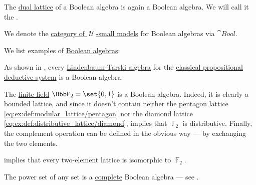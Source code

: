 \begin{definition}
\begin{thmenum}[resume=def:boolean_algebra]
     The \hyperref[def:lattice/opposite]{dual lattice} of a Boolean algebra is again a Boolean algebra. We will call it the .

     We denote the \hyperref[def:category_of_small_first_order_models]{category of \( \mscrU \)-small models} for Boolean algebras via \( \cat{Bool} \).
  \end{thmenum}
\end{definition}

\begin{example}\label{ex:def:boolean_algebra}
  We list examples of \hyperref[def:boolean_algebra]{Boolean algebras}:

  \begin{thmenum}
     As shown in , every \hyperref[def:lindenbaum_tarski_algebra]{Lindenbaum-Tarski algebra} for the \hyperref[def:classical_propositional_deduction_systems]{classical propositional deductive system} is a Boolean algebra.

     The \hyperref[def:finite_field]{finite field} \( \BbbF_2 = \set{ 0, 1 } \) is a Boolean algebra. Indeed, it is clearly a bounded lattice, and since it doesn't contain neither the pentagon lattice \eqref{eq:ex:def:modular_lattice/pentagon} nor the diamond lattice \eqref{eq:ex:def:distributive_lattice/diamond},  implies that \( \BbbF_2 \) is distributive. Finally, the complement operation can be defined in the obvious way --- by exchanging the two elements.

     implies that every two-element lattice is isomorphic to \( \BbbF_2 \).

     The power set of any set is a \hyperref[def:complete_lattice]{complete} Boolean algebra --- see .
  \end{thmenum}
\end{example}

